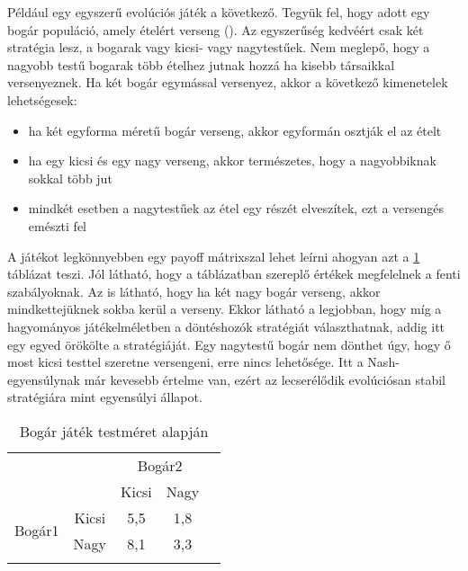 Például egy egyszerű evolúciós játék a következő. Tegyük fel, hogy adott egy bogár populáció, amely ételért verseng (\cite{book:egt}). Az egyszerűség kedvéért csak két stratégia lesz, a bogarak vagy kicsi- vagy nagytestűek. Nem meglepő, hogy a nagyobb testű bogarak több ételhez jutnak hozzá ha kisebb társaikkal versenyeznek. Ha két bogár egymással versenyez, akkor a következő kimenetelek lehetségesek:
\begin{itemize}[noitemsep]
	\item ha két egyforma méretű bogár verseng, akkor egyformán osztják el az ételt
	\item ha egy kicsi és egy nagy verseng, akkor természetes, hogy a nagyobbiknak sokkal több jut
	\item mindkét esetben a nagytestűek az étel egy részét elveszítek, ezt a versengés emészti fel 
\end{itemize}
A játékot legkönnyebben egy payoff mátrixszal lehet leírni ahogyan azt a \ref{fig:beetle} táblázat teszi. Jól látható, hogy a táblázatban szereplő értékek megfelelnek a fenti szabályoknak. Az is látható, hogy ha két nagy bogár verseng, akkor mindkettejüknek sokba kerül a verseny.
Ekkor látható a legjobban, hogy míg a hagyományos játékelméletben a döntéshozók stratégiát választhatnak, addig itt egy egyed örökölte a stratégiáját. Egy nagytestű bogár nem dönthet úgy, hogy ő most kicsi testtel szeretne versengeni, erre nincs lehetősége. Itt a Nash-egyensúlynak már kevesebb értelme van, ezért az lecserélődik evolúciósan stabil stratégiára mint egyensúlyi állapot.

\begin{table}[htb!]
	\centering
	\begin{tabular}{ccccc}
		&       & \multicolumn{2}{c}{Bogár2} &  \\
		\multicolumn{1}{c}{}    &       & Kicsi        & Nagy        &  \\ \cline{3-4}
		\multirow{2}{*}{Bogár1} & Kicsi & \multicolumn{1}{|c|}{5,5}          & \multicolumn{1}{c|}{1,8}         &  \\ \cline{3-4}
		& Nagy  & \multicolumn{1}{|c|}{8,1}          & \multicolumn{1}{c|}{3,3}         & \\ \cline{3-4} \\
	\end{tabular}
	\caption{Bogár játék testméret alapján}
	\label{fig:beetle}
\end{table}

